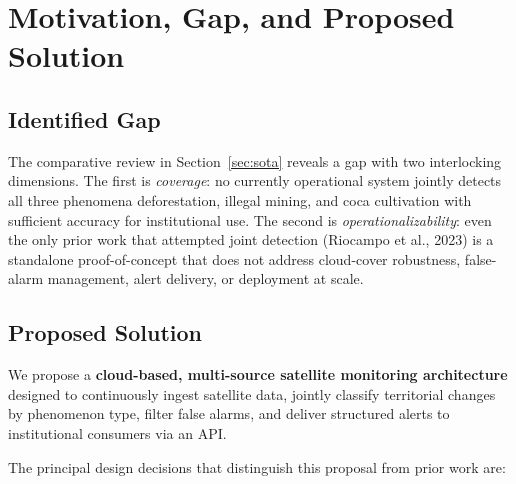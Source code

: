 \documentclass{article}
\begin{document}
\section{Motivation, Gap, and Proposed Solution}
\label{sec:gap}

\subsection{Identified Gap}

The comparative review in Section~\ref{sec:sota} reveals a gap with two
interlocking dimensions.
The first is \textit{coverage}: no currently operational system jointly detects
all three phenomena deforestation, illegal mining, and coca cultivation with
sufficient accuracy for institutional use.
The second is \textit{operationalizability}: even the only prior work that
attempted joint detection (Riocampo et al., 2023) is a standalone
proof-of-concept that does not address cloud-cover robustness, false-alarm
management, alert delivery, or deployment at scale.

\subsection{Proposed Solution}

We propose a \textbf{cloud-based, multi-source satellite monitoring architecture}
designed to continuously ingest satellite data, jointly classify territorial
changes by phenomenon type, filter false alarms, and deliver structured alerts
to institutional consumers via an API.

The principal design decisions that distinguish this proposal from prior work are:
\end{document}
